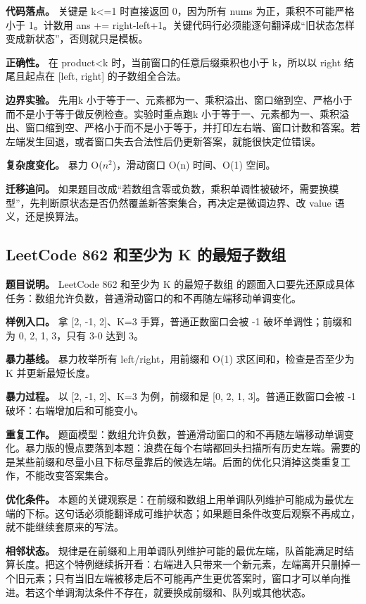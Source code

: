 \textbf{代码落点。} 关键是 k<=1 时直接返回 0，因为所有 nums 为正，乘积不可能严格小于 1。计数用 ans += right-left+1。关键代码行必须能逐句翻译成“旧状态怎样变成新状态”，否则就只是模板。

\textbf{正确性。} 在 product<k 时，当前窗口的任意后缀乘积也小于 k，所以以 right 结尾且起点在 [left, right] 的子数组全合法。

\textbf{边界实验。} 先用k 小于等于一、元素都为一、乘积溢出、窗口缩到空、严格小于而不是小于等于做反例检查。实验时重点跑k 小于等于一、元素都为一、乘积溢出、窗口缩到空、严格小于而不是小于等于，并打印左右端、窗口计数和答案。若左端发生回退，或者窗口失去合法性后仍更新答案，就能很快定位错误。

\textbf{复杂度变化。} 暴力 O(\ensuremath{n^{2}})，滑动窗口 O(n) 时间、O(1) 空间。

\textbf{迁移追问。} 如果题目改成“若数组含零或负数，乘积单调性被破坏，需要换模型”，先判断原状态是否仍然覆盖新答案集合，再决定是微调边界、改 value 语义，还是换算法。

\subsection{LeetCode 862 和至少为 K 的最短子数组}

\textbf{题目说明。} LeetCode 862 和至少为 K 的最短子数组 的题面入口要先还原成具体任务：数组允许负数，普通滑动窗口的和不再随左端移动单调变化。

\textbf{样例入口。} 拿 [2, -1, 2]、K=3 手算，普通正数窗口会被 -1 破坏单调性；前缀和为 0, 2, 1, 3，只有 3-0 达到 3。

\textbf{暴力基线。} 暴力枚举所有 left/right，用前缀和 O(1) 求区间和，检查是否至少为 K 并更新最短长度。

\textbf{暴力过程。} 以 [2, -1, 2]、K=3 为例，前缀和是 [0, 2, 1, 3]。普通正数窗口会被 -1 破坏：右端增加后和可能变小。

\textbf{重复工作。} 题面模型：数组允许负数，普通滑动窗口的和不再随左端移动单调变化。暴力版的慢点要落到本题：浪费在每个右端都回头扫描所有历史左端。需要的是某些前缀和尽量小且下标尽量靠后的候选左端。后面的优化只消掉这类重复工作，不能改变答案集合。

\textbf{优化条件。} 本题的关键观察是：在前缀和数组上用单调队列维护可能成为最优左端的下标。这句话必须能翻译成可维护状态；如果题目条件改变后观察不再成立，就不能继续套原来的写法。

\textbf{相邻状态。} 规律是在前缀和上用单调队列维护可能的最优左端，队首能满足时结算长度。把这个特例继续拆开看：右端进入只带来一个新元素，左端离开只删掉一个旧元素；只有当旧左端被移走后不可能再产生更优答案时，窗口才可以单向推进。若这个单调淘汰条件不存在，就要换成前缀和、队列或其他状态。

